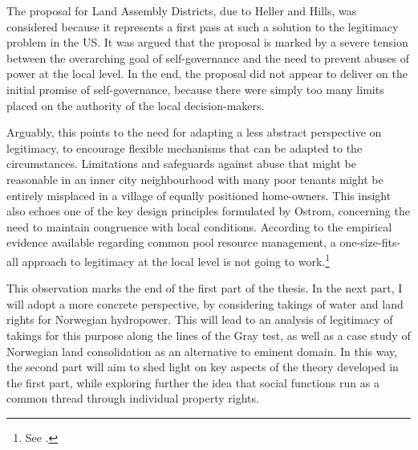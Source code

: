 The proposal for Land Assembly Districts, due to Heller and Hills, was considered because it represents a first pass at such a solution to the legitimacy problem in the US. It was argued that the proposal is marked by a severe tension between the overarching goal of self-governance and the need to prevent abuses of power at the local level. In the end, the proposal did not appear to deliver on the initial promise of self-governance, because there were simply too many limits placed on the authority of the local decision-makers.

Arguably, this points to the need for adapting a less abstract perspective on legitimacy, to encourage flexible mechanisms that can be adapted to the circumstances. Limitations and safeguards against abuse that might be reasonable in an inner city neighbourhood with many poor tenants might be entirely misplaced in a village of equally positioned home-owners. This insight also echoes one of the key design principles formulated by Ostrom, concerning the need to maintain congruence with local conditions. According to the empirical evidence available regarding common pool resource management, a one-size-fits-all approach to legitimacy at the local level is not going to work.\footnote{See \cite{cox10}.}

This observation marks the end of the first part of the thesis. In the next part, I will adopt a more concrete perspective, by considering takings of water and land rights for Norwegian hydropower. This will lead to an analysis of legitimacy of takings for this purpose along the lines of the Gray test, as well as a case study of Norwegian land consolidation as an alternative to eminent domain. In this way, the second part will aim to shed light on key aspects of the theory developed in the first part, while exploring further the idea that social functions run as a common thread through individual property rights.